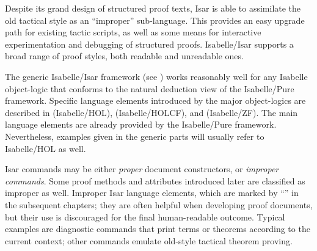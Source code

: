 \begin{isabellebody}
\begin{isamarkuptext}
  Despite its grand design of structured proof texts, Isar is able to
  assimilate the old tactical style as an ``improper'' sub-language.
  This provides an easy upgrade path for existing tactic scripts, as
  well as some means for interactive experimentation and debugging of
  structured proofs.  Isabelle/Isar supports a broad range of proof
  styles, both readable and unreadable ones.

  \medskip The generic Isabelle/Isar framework (see
  ) works reasonably well for any Isabelle
  object-logic that conforms to the natural deduction view of the
  Isabelle/Pure framework.  Specific language elements introduced by
  the major object-logics are described in 
  (Isabelle/HOL),  (Isabelle/HOLCF), and 
  (Isabelle/ZF).  The main language elements are already provided by
  the Isabelle/Pure framework. Nevertheless, examples given in the
  generic parts will usually refer to Isabelle/HOL as well.

  \medskip Isar commands may be either \emph{proper} document
  constructors, or \emph{improper commands}.  Some proof methods and
  attributes introduced later are classified as improper as well.
  Improper Isar language elements, which are marked by ``'' in the subsequent chapters; they are often helpful
  when developing proof documents, but their use is discouraged for
  the final human-readable outcome.  Typical examples are diagnostic
  commands that print terms or theorems according to the current
  context; other commands emulate old-style tactical theorem proving.%
\end{isamarkuptext}%
\isamarkuptrue%
%
\isadelimtheory
%
\endisadelimtheory
%
\isatagtheory
{}\isamarkupfalse%
%
\endisatagtheory
{\isafoldtheory}%
%
\isadelimtheory
%
\endisadelimtheory
\isanewline
\end{isabellebody}%
